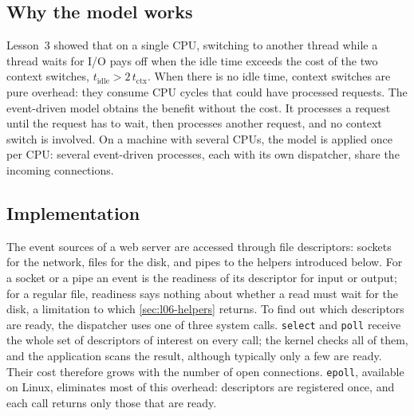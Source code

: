\documentclass[../main.tex]{subfiles}
\begin{document}
\subsection{Why the model works}

Lesson~3 showed that on a single CPU, switching to another thread while a
thread waits for I/O pays off when the idle time exceeds the cost of the two
context switches, $t_{\mathrm{idle}} > 2\, t_{\mathrm{ctx}}$.  When there is
no idle time, context switches are pure overhead: they consume CPU cycles
that could have processed requests.
The event-driven model obtains the benefit without the cost.  It processes a
request until the request has to wait, then processes another request, and
no context switch is involved.
On a machine with several CPUs, the model is applied once per CPU: several
event-driven processes, each with its own dispatcher, share the incoming
connections.

\subsection{Implementation}

The event sources of a web server are accessed through file descriptors:
sockets for the network, files for the disk, and pipes to the helpers
introduced below.  For a socket or a pipe an event is the readiness of its
descriptor for input or output; for a regular file, readiness says nothing
about whether a read must wait for the disk, a limitation to which
\cref{sec:l06-helpers} returns.  To find out which descriptors are ready,
the dispatcher uses one of three system calls.
\texttt{select} and \texttt{poll} receive the whole set of descriptors of
interest on every call; the kernel checks all of them, and the application
scans the result, although typically only a few are ready.  Their cost
therefore grows with the number of open connections.
\texttt{epoll},
available on Linux, eliminates most of this overhead: descriptors are
registered once, and each call returns only those that are
ready.
\end{document}
